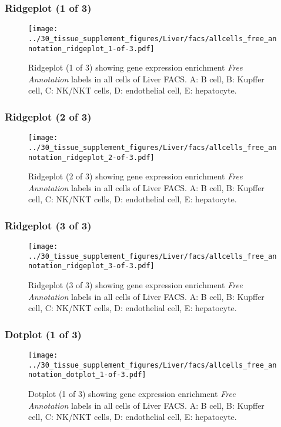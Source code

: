 \clearpage

\subsubsection{Ridgeplot (1 of 3)}
\begin{figure}[h]
\centering
\texttt{[image: ../30\_tissue\_supplement\_figures/Liver/facs/allcells\_free\_annotation\_ridgeplot\_1-of-3.pdf]}

\caption{ Ridgeplot (1 of 3)  showing gene expression enrichment \emph{Free Annotation} labels in all cells of Liver FACS. A: B cell, B: Kupffer cell, C: NK/NKT cells, D: endothelial cell, E: hepatocyte.}
\end{figure}


\clearpage

\subsubsection{Ridgeplot (2 of 3)}
\begin{figure}[h]
\centering
\texttt{[image: ../30\_tissue\_supplement\_figures/Liver/facs/allcells\_free\_annotation\_ridgeplot\_2-of-3.pdf]}

\caption{ Ridgeplot (2 of 3)  showing gene expression enrichment \emph{Free Annotation} labels in all cells of Liver FACS. A: B cell, B: Kupffer cell, C: NK/NKT cells, D: endothelial cell, E: hepatocyte.}
\end{figure}


\clearpage

\subsubsection{Ridgeplot (3 of 3)}
\begin{figure}[h]
\centering
\texttt{[image: ../30\_tissue\_supplement\_figures/Liver/facs/allcells\_free\_annotation\_ridgeplot\_3-of-3.pdf]}

\caption{ Ridgeplot (3 of 3)  showing gene expression enrichment \emph{Free Annotation} labels in all cells of Liver FACS. A: B cell, B: Kupffer cell, C: NK/NKT cells, D: endothelial cell, E: hepatocyte.}
\end{figure}


\clearpage

\subsubsection{Dotplot (1 of 3)}
\begin{figure}[h]
\centering
\texttt{[image: ../30\_tissue\_supplement\_figures/Liver/facs/allcells\_free\_annotation\_dotplot\_1-of-3.pdf]}

\caption{ Dotplot (1 of 3)  showing gene expression enrichment \emph{Free Annotation} labels in all cells of Liver FACS. A: B cell, B: Kupffer cell, C: NK/NKT cells, D: endothelial cell, E: hepatocyte.}
\end{figure}


